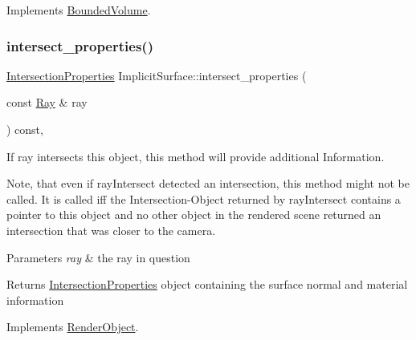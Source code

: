 Implements \mbox{\hyperlink{classBoundedVolume_a281168c4d827c38b46e639f6e4991a9e}{Bounded\+Volume}}.

\mbox{\label{classImplicitSurface_a13aa500c7dbcd75e77b43fba741b1ec8}} 
\subsubsection{\texorpdfstring{intersect\_properties()}{intersect\_properties()}}
{\footnotesize\ttfamily \mbox{\hyperlink{classIntersectionProperties}{Intersection\+Properties}} Implicit\+Surface\+::intersect\+\_\+properties (\begin{DoxyParamCaption}\item[{const \mbox{\hyperlink{classRay}{Ray}} \&}]{ray }\end{DoxyParamCaption}) const\hspace{0.3cm}{\ttfamily [override]}, {\ttfamily [virtual]}}



If ray intersects this object, this method will provide additional Information. 

Note, that even if ray\+Intersect detected an intersection, this method might not be called. It is called iff the Intersection-\/\+Object returned by ray\+Intersect contains a pointer to this object and no other object in the rendered scene returned an intersection that was closer to the camera.


\begin{DoxyParams}{Parameters}
{\em ray} & the ray in question \\
\hline
\end{DoxyParams}
\begin{DoxyReturn}{Returns}
\mbox{\hyperlink{classIntersectionProperties}{Intersection\+Properties}} object containing the surface normal and material information 
\end{DoxyReturn}


Implements \mbox{\hyperlink{classRenderObject_a792d36570e3264530872187ca1b0baca}{Render\+Object}}.

\mbox{\label{classImplicitSurface_a2267c88829c97c12ff8f7d250ce94802}} 
